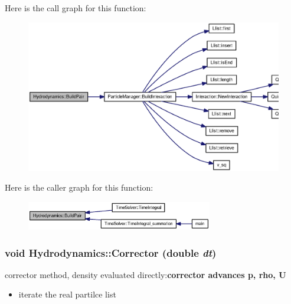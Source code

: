 Here is the call graph for this function:\nopagebreak
\begin{figure}[H]
\begin{center}
\leavevmode
\includegraphics[width=340pt]{classHydrodynamics_41e1527e65d6f93d81c30467871021f5_cgraph}
\end{center}
\end{figure}


Here is the caller graph for this function:\nopagebreak
\begin{figure}[H]
\begin{center}
\leavevmode
\includegraphics[width=230pt]{classHydrodynamics_41e1527e65d6f93d81c30467871021f5_icgraph}
\end{center}
\end{figure}
\hypertarget{classHydrodynamics_928a3fb7752d458026ed06dca1fbf137}{
\subsubsection[{Corrector}]{\setlength{\rightskip}{0pt plus 5cm}void Hydrodynamics::Corrector (double {\em dt})}}
\label{classHydrodynamics_928a3fb7752d458026ed06dca1fbf137}


corrector method, density evaluated directly:{\bf  corrector advances p, rho, U} 



\begin{itemize}
\item iterate the real partilce list\end{itemize}


